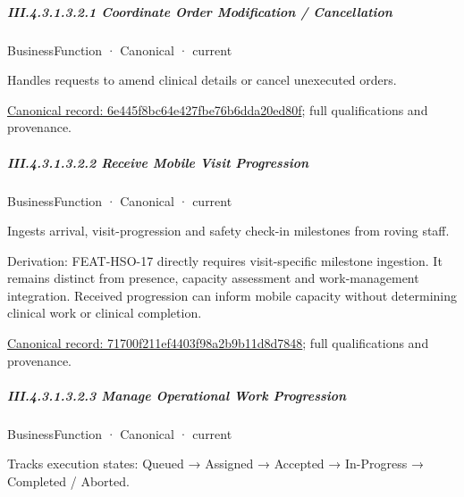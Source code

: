 \subparagraph*{III.4.3.1.3.2.1 Coordinate Order Modification / Cancellation}
\label{navigation:III.4.3.1.3.2.1}

\label{element:6e445f8bc64e427fbe76b6dda20ed80f}
{\small BusinessFunction · Canonical · current}\par

Handles requests to amend clinical details or cancel unexecuted orders.


{\footnotesize \href{../../../../../../../continuum/business/business-function/6e445f8bc64e427fbe76b6dda20ed80f.md}{Canonical record: 6e445f8bc64e427fbe76b6dda20ed80f}; full qualifications and provenance.}\par
\subparagraph*{III.4.3.1.3.2.2 Receive Mobile Visit Progression}
\label{navigation:III.4.3.1.3.2.2}

\label{element:71700f211ef4403f98a2b9b11d8d7848}
{\small BusinessFunction · Canonical · current}\par

Ingests arrival, visit-progression and safety check-in milestones from roving staff.



Derivation: FEAT-HSO-17 directly requires visit-specific milestone ingestion. It remains distinct from presence, capacity assessment and work-management integration. Received progression can inform mobile capacity without determining clinical work or clinical completion.


{\footnotesize \href{../../../../../../../continuum/business/business-function/71700f211ef4403f98a2b9b11d8d7848.md}{Canonical record: 71700f211ef4403f98a2b9b11d8d7848}; full qualifications and provenance.}\par
\subparagraph*{III.4.3.1.3.2.3 Manage Operational Work Progression}
\label{navigation:III.4.3.1.3.2.3}

\label{element:ebc35951617a4f92863922b74dd1c1f4}
{\small BusinessFunction · Canonical · current}\par

Tracks execution states: Queued → Assigned → Accepted → In-Progress → Completed / Aborted.


